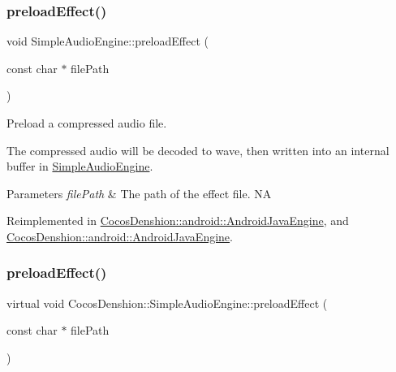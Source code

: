 \mbox{\label{classCocosDenshion_1_1SimpleAudioEngine_ab4c7a383c668003d48094a3ed867a778}} 
\subsubsection{\texorpdfstring{preload\+Effect()}{preloadEffect()}\hspace{0.1cm}{\footnotesize\ttfamily [1/2]}}
{\footnotesize\ttfamily void Simple\+Audio\+Engine\+::preload\+Effect (\begin{DoxyParamCaption}\item[{const char $\ast$}]{file\+Path }\end{DoxyParamCaption})\hspace{0.3cm}{\ttfamily [virtual]}}

Preload a compressed audio file.

The compressed audio will be decoded to wave, then written into an internal buffer in \hyperlink{classCocosDenshion_1_1SimpleAudioEngine}{Simple\+Audio\+Engine}.


\begin{DoxyParams}{Parameters}
{\em file\+Path} & The path of the effect file.  NA \\
\hline
\end{DoxyParams}


Reimplemented in \hyperlink{classCocosDenshion_1_1android_1_1AndroidJavaEngine_aa863dece58028ea4877b1215a5a9bd7c}{Cocos\+Denshion\+::android\+::\+Android\+Java\+Engine}, and \hyperlink{classCocosDenshion_1_1android_1_1AndroidJavaEngine_ab6bfd3367f805e7df12ed912e7933c22}{Cocos\+Denshion\+::android\+::\+Android\+Java\+Engine}.

\mbox{\label{classCocosDenshion_1_1SimpleAudioEngine_a94bdde9ae877664da2dd9e7e023f3e68}} 
\subsubsection{\texorpdfstring{preload\+Effect()}{preloadEffect()}\hspace{0.1cm}{\footnotesize\ttfamily [2/2]}}
{\footnotesize\ttfamily virtual void Cocos\+Denshion\+::\+Simple\+Audio\+Engine\+::preload\+Effect (\begin{DoxyParamCaption}\item[{const char $\ast$}]{file\+Path }\end{DoxyParamCaption})\hspace{0.3cm}{\ttfamily [virtual]}}

